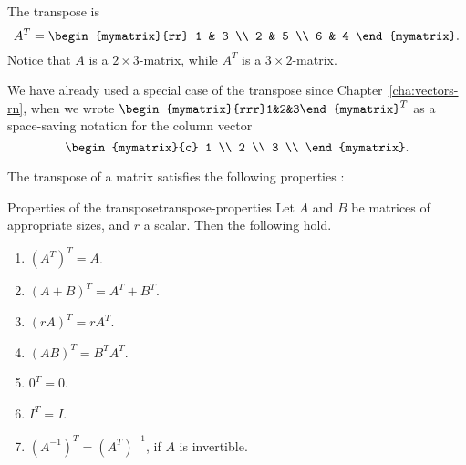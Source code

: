 \begin{solution}
  The transpose is
  \begin{equation*}
    A^T =
    \begin{mymatrix}{rr}
      1 & 3 \\
      2 & 5 \\
      6 & 4
    \end{mymatrix}.
  \end{equation*}
  Notice that $A$ is a $2\times 3$-matrix, while $A^T$ is a
  $3\times 2$-matrix.
\end{solution}

We have already used a special case of the transpose since
Chapter~\ref{cha:vectors-rn}, when we wrote
$\begin{mymatrix}{rrr}1&2&3\end{mymatrix}^T$ as a space-saving
notation for the column vector
\begin{equation*}
  \begin{mymatrix}{c}
    1 \\
    2 \\
    3 \\
  \end{mymatrix}.
\end{equation*}

The transpose of a matrix satisfies the following
properties%
%
%
:

\begin{lemma}{Properties of the transpose}{transpose-properties}
  Let $A$ and $B$ be matrices of appropriate sizes, and $r$ a
  scalar. Then the following hold.
  \begin{enumerate}
  \item $(A^T)^T = A$.
  \item $(A+B)^T=A^T+B^T$.\label{matrix-transpose-2}
  \item $(rA)^T=rA^T$.\label{matrix-transpose-3}
  \item $(AB)^T=B^TA^T$.\label{matrix-transpose-4}
  \item $0^T = 0$.
  \item $I^T = I$.
  \item $(A^{-1})^T = (A^T)^{-1}$, if $A$ is invertible.
  \end{enumerate}
\end{lemma}

